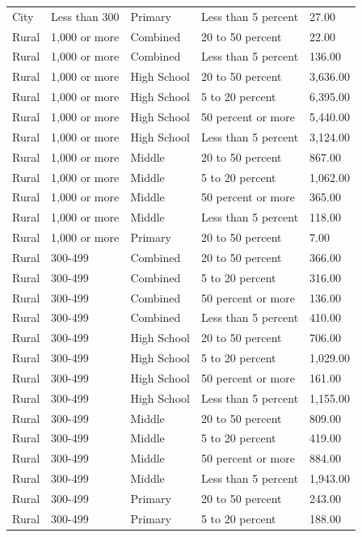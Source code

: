 \documentclass[
  man, fleqn, noextraspace]{apa6}
\begin{document}
\begin{table}[tbp]
\begin{center}
\begin{threeparttable}
\begin{tabular}{lllll}
City & Less than 300 & Primary & Less than 5 percent & 27.00\\
Rural & 1,000 or more & Combined & 20 to 50 percent & 22.00\\
Rural & 1,000 or more & Combined & Less than 5 percent & 136.00\\
Rural & 1,000 or more & High School & 20 to 50 percent & 3,636.00\\
Rural & 1,000 or more & High School & 5 to 20 percent & 6,395.00\\
Rural & 1,000 or more & High School & 50 percent or more & 5,440.00\\
Rural & 1,000 or more & High School & Less than 5 percent & 3,124.00\\
Rural & 1,000 or more & Middle & 20 to 50 percent & 867.00\\
Rural & 1,000 or more & Middle & 5 to 20 percent & 1,062.00\\
Rural & 1,000 or more & Middle & 50 percent or more & 365.00\\
Rural & 1,000 or more & Middle & Less than 5 percent & 118.00\\
Rural & 1,000 or more & Primary & 20 to 50 percent & 7.00\\
Rural & 300-499 & Combined & 20 to 50 percent & 366.00\\
Rural & 300-499 & Combined & 5 to 20 percent & 316.00\\
Rural & 300-499 & Combined & 50 percent or more & 136.00\\
Rural & 300-499 & Combined & Less than 5 percent & 410.00\\
Rural & 300-499 & High School & 20 to 50 percent & 706.00\\
Rural & 300-499 & High School & 5 to 20 percent & 1,029.00\\
Rural & 300-499 & High School & 50 percent or more & 161.00\\
Rural & 300-499 & High School & Less than 5 percent & 1,155.00\\
Rural & 300-499 & Middle & 20 to 50 percent & 809.00\\
Rural & 300-499 & Middle & 5 to 20 percent & 419.00\\
Rural & 300-499 & Middle & 50 percent or more & 884.00\\
Rural & 300-499 & Middle & Less than 5 percent & 1,943.00\\
Rural & 300-499 & Primary & 20 to 50 percent & 243.00\\
Rural & 300-499 & Primary & 5 to 20 percent & 188.00\\

\end{tabular}
\end{threeparttable}
\end{center}
\end{table}
\end{document}
